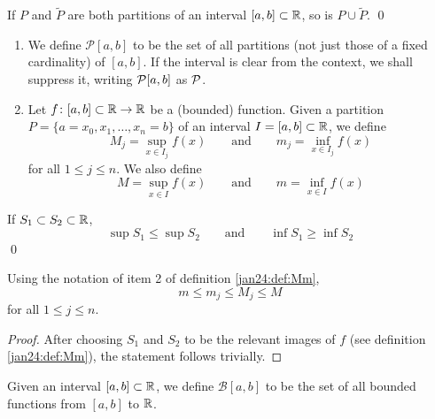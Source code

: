 \begin{claim}
  If $P$ and $\tilde{P}$ are both partitions of an interval $[a, b] \subset \mathbb{R}$, so is $P \cup \tilde{P}$. \qed
\end{claim}

\begin{defn}
  \label{jan24:def:Mm}
  \hfill
  \begin{enumerate}[label = \arabic*), itemsep = 10pt]
  \item
    We define $\mathcal{P}[a, b]$ to be the set of all partitions (not just those of a fixed cardinality) of $[a, b]$. If the interval is clear from the context, we shall suppress it, writing $\mathcal{P}[a, b]$ as $\mathcal{P}$.

  \item
    Let $f \colon [a, b] \subset \mathbb{R} \to \mathbb{R}$ be a (bounded) function.
    Given a partition $P = \{a = x_0, x_1, \dots ,x_n = b \}$ of an interval $I = [a, b] \subset \mathbb{R}$, we define
    \[
      M_j = \sup_{x \in I_j} f(x)
      \qquad
      \text{and}
      \qquad
      m_j = \inf_{x \in I_j} f(x)
    \]
    for all $1 \leq j \leq n$. We also define
    \[
      M = \sup_{x \in I} f(x)
      \qquad
      \text{and}
      \qquad
      m = \inf_{x \in I} f(x)
    \]
    
  \end{enumerate}
\end{defn}

\begin{claim}
  If $S_1 \subset S_2 \subset \mathbb{R}$,
  \[
    \sup S_1 \leq \sup S_2
    \qquad
    \text{and}
    \qquad
    \inf S_1 \geq \inf S_2
  \]
  \hfill\qed
\end{claim}

\begin{corr}
  \label{jan24:corr:mMIneq}
  Using the notation of item 2 of definition \ref{jan24:def:Mm},
  \[
    m \leq m_j \leq M_j \leq M
  \]
  for all $1 \leq j \leq n$.
\end{corr}

\begin{proof}
  After choosing $S_1$ and $S_2$ to be the relevant images of $f$ (see definition \ref{jan24:def:Mm}), the statement follows trivially. \hfill
\end{proof}

\begin{defn}
  Given an interval $[a, b] \subset \mathbb{R}$, we define $\mathcal{B}[a, b]$ to be the set of all bounded functions from $[a, b]$ to $\mathbb{R}$.
\end{defn}

